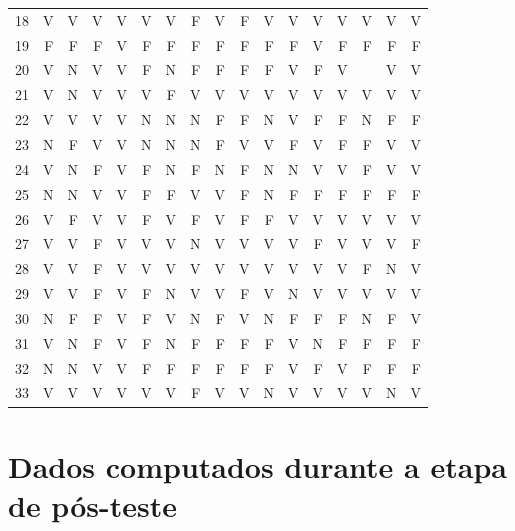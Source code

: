 \begin{apendicesenv}
\begin{center}
\begin{tabular}{ l r r r r r r r r r r r r r r r r}
	18	&	V	&	V	&	V	&	V	&	V	&	V	&	F	&	V	&	F	&	V	&	V	&	V	&	V	&	V	&	V	&	V	\\
	19	&	F	&	F	&	F	&	V	&	F	&	F	&	F	&	F	&	F	&	F	&	F	&	V	&	F	&	F	&	F	&	F	\\
	20	&	V	&	N	&	V	&	V	&	F	&	N	&	F	&	F	&	F	&	F	&	V	&	F	&	V	&		&	V	&	V	\\
	21	&	V	&	N	&	V	&	V	&	V	&	F	&	V	&	V	&	V	&	V	&	V	&	V	&	V	&	V	&	V	&	V	\\
	22	&	V	&	V	&	V	&	V	&	N	&	N	&	N	&	F	&	F	&	N	&	V	&	F	&	F	&	N	&	F	&	F	\\
	23	&	N	&	F	&	V	&	V	&	N	&	N	&	N	&	F	&	V	&	V	&	F	&	V	&	F	&	F	&	V	&	V	\\
	24	&	V	&	N	&	F	&	V	&	F	&	N	&	F	&	N	&	F	&	N	&	N	&	V	&	V	&	F	&	V	&	V	\\
	25	&	N	&	N	&	V	&	V	&	F	&	F	&	V	&	V	&	F	&	N	&	F	&	F	&	F	&	F	&	F	&	F	\\
	26	&	V	&	F	&	V	&	V	&	F	&	V	&	F	&	V	&	F	&	F	&	V	&	V	&	V	&	V	&	V	&	V	\\
	27	&	V	&	V	&	F	&	V	&	V	&	V	&	N	&	V	&	V	&	V	&	V	&	F	&	V	&	V	&	V	&	F	\\
	28	&	V	&	V	&	F	&	V	&	V	&	V	&	V	&	V	&	V	&	V	&	V	&	V	&	V	&	F	&	N	&	V	\\
	29	&	V	&	V	&	F	&	V	&	F	&	N	&	V	&	V	&	F	&	V	&	N	&	V	&	V	&	V	&	V	&	V	\\
	30	&	N	&	F	&	F	&	V	&	F	&	V	&	N	&	F	&	V	&	N	&	F	&	F	&	F	&	N	&	F	&	V	\\
	31	&	V	&	N	&	F	&	V	&	F	&	N	&	F	&	F	&	F	&	F	&	V	&	N	&	F	&	F	&	F	&	F	\\
	32	&	N	&	N	&	V	&	V	&	F	&	F	&	F	&	F	&	F	&	F	&	V	&	F	&	V	&	F	&	F	&	F	\\
	33	&	V	&	V	&	V	&	V	&	V	&	V	&	F	&	V	&	V	&	N	&	V	&	V	&	V	&	V	&	N	&	V	\\
	
	\hline
	\bottomrule
	\end{tabular}
\end{center}


\chapter{Dados computados durante a etapa de pós-teste}\label{chap:resul2}


\end{apendicesenv}
